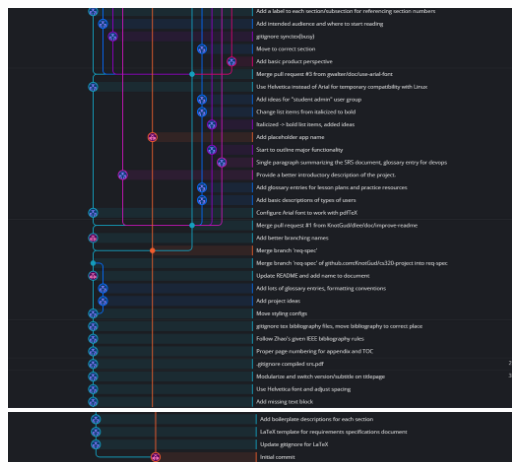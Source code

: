 \begin{center}
        \includegraphics[width=.8\textwidth]{images/4.png}
        \includegraphics[width=.8\textwidth]{images/5.png}
    \end{center}